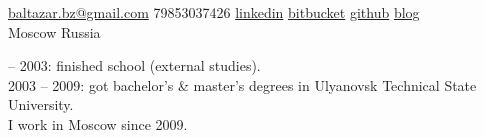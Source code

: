 \documentclass[unicode, 10pt, a4paper, oneside, fleqn]{article}
\begin{document}
\sloppy  %


\nobreakvspace{0.3em}  %

\noindent\href{mailto:baltazar.dot.bz.at.gmail.dot.com}{baltazar.bz\mbox{}@\mbox{}gmail.com}\sbull
\textsmaller{+}79853037426\sbull
\href{http://ru.linkedin.com/pub/yuri-bochkarev/21/3a9/555}{linkedin}
\sbull
\href{https://bitbucket.org/balta2ar}{bitbucket}
\sbull
\href{https://github.org/balta2ar}{github}
\sbull
\href{http://baltazar-bz.blogspot.com/}{blog}
\\
Moscow\sbull
Russia
\spacedhrule{0.9em}{-0.4em}  %


\vspace{-1.3em}  %

\begin{multicols}{2}  %
 -- 2003: finished school (external studies).\\
2003 -- 2009: got bachelor's \& master's degrees in Ulyanovsk Technical State
University. \\
I work in Moscow since 2009.
\end{multicols}
\spacedhrule{0em}{-0.4em}

\end{document}
